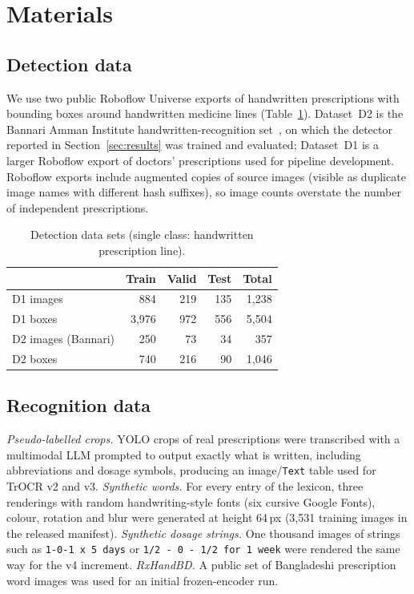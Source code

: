 \documentclass[journal]{IEEEtran}
\begin{document}
\section{Materials}\label{sec:data}

\subsection{Detection data}
We use two public Roboflow Universe exports of handwritten prescriptions with bounding boxes around handwritten medicine lines (Table~\ref{tab:data}). Dataset~D2 is the Bannari Amman Institute handwritten-recognition set~\cite{bannari2023handwritten}, on which the detector reported in Section~\ref{sec:results} was trained and evaluated; Dataset~D1 is a larger Roboflow export of doctors' prescriptions used for pipeline development. Roboflow exports include augmented copies of source images (visible as duplicate image names with different hash suffixes), so image counts overstate the number of independent prescriptions.

\begin{table}[t]
\centering
\caption{Detection data sets (single class: handwritten prescription line).}
\label{tab:data}
\begin{tabular}{lrrrr}
\toprule
 & \textbf{Train} & \textbf{Valid} & \textbf{Test} & \textbf{Total} \\
\midrule
D1 images & 884 & 219 & 135 & 1{,}238 \\
D1 boxes  & 3{,}976 & 972 & 556 & 5{,}504 \\
D2 images (Bannari) & 250 & 73 & 34 & 357 \\
D2 boxes & 740 & 216 & 90 & 1{,}046 \\
\bottomrule
\end{tabular}
\end{table}

\subsection{Recognition data}
\emph{Pseudo-labelled crops.} YOLO crops of real prescriptions were transcribed with a multimodal LLM prompted to output exactly what is written, including abbreviations and dosage symbols, producing an image/\texttt{Text} table used for TrOCR v2 and v3. \emph{Synthetic words.} For every entry of the lexicon, three renderings with random handwriting-style fonts (six cursive Google Fonts), colour, rotation and blur were generated at height 64\,px (3{,}531 training images in the released manifest). \emph{Synthetic dosage strings.} One thousand images of strings such as \texttt{1-0-1 x 5 days} or \texttt{1/2 - 0 - 1/2 for 1 week} were rendered the same way for the v4 increment. \emph{RxHandBD.} A public set of Bangladeshi prescription word images was used for an initial frozen-encoder run.
\end{document}
